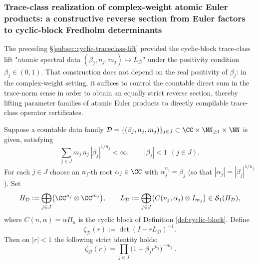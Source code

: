 \subsubsection{Trace-class realization of complex-weight atomic Euler products: a constructive reverse section from Euler factors to cyclic-block Fredholm determinants}\label{subsec:cyclic-traceclass-lift-complex}
The preceding \S\ref{subsec:cyclic-traceclass-lift} provided the cyclic-block trace-class lift "atomic spectral data \((\beta_j,n_j,m_j)\mapsto L_{\mathcal D}\)" under the positivity condition \(\beta_j\in(0,1)\).
That construction does not depend on the real positivity of \(\beta_j\): in the complex-weight setting, it suffices to control the countable direct sum in the trace-norm sense in order to obtain an equally strict reverse section, thereby lifting parameter families of atomic Euler products to directly compilable trace-class operator certificates.

\begin{corollary}\label{cor:cyclic-euler-product-complex-section}
Suppose a countable data family \(\mathcal D=\{(\beta_j,n_j,m_j)\}_{j\in J}\subset \CC\times \NN_{\ge 1}\times \NN\) is given, satisfying
\begin{equation}\label{eq:tc-executability-complex}
\sum_{j\in J} m_j\,n_j\,|\beta_j|^{1/n_j}<\infty,
\qquad
|\beta_j|<1\ \ (j\in J).
\end{equation}
For each \(j\in J\) choose an \(n_j\)-th root \(\alpha_j\in\CC\) with \(\alpha_j^{n_j}=\beta_j\) (so that \(|\alpha_j|=|\beta_j|^{1/n_j}\)).
Set
\[
H_{\mathcal D}:=\bigoplus_{j\in J}\bigl(\CC^{n_j}\otimes \CC^{m_j}\bigr),
\qquad
L_{\mathcal D}:=\bigoplus_{j\in J}\bigl(C(n_j,\alpha_j)\otimes I_{m_j}\bigr)\in \mathcal{S}_1(H_{\mathcal D}),
\]
where \(C(n,\alpha)=\alpha\Pi_n\) is the cyclic block of Definition \ref{def:cyclic-block}.
Define
\[
\zeta_{\mathcal D}(r):=\det(I-rL_{\mathcal D})^{-1}.
\]
Then on \(|r|<1\) the following strict identity holds:
\[
\boxed{\;
\zeta_{\mathcal D}(r)=\prod_{j\in J}\bigl(1-\beta_j r^{n_j}\bigr)^{-m_j}\; }.
\]
\end{corollary}

